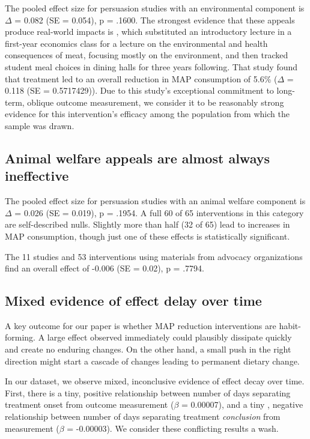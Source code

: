 \documentclass[sn-nature,referee,pdflatex]{sn-jnl}
\begin{document}
The pooled effect size for persuasion studies with an environmental
component is \(\Delta\) = 0.082 (SE = 0.054), p = .1600. The strongest
evidence that these appeals produce real-world impacts is
\citep{jalil2023}, which substituted an introductory lecture in a
first-year economics class for a lecture on the environmental and health
consequences of meat, focusing mostly on the environment, and then
tracked student meal choices in dining halls for three years following.
That study found that treatment led to an overall reduction in MAP
consumption of 5.6\% (\(\Delta\) = 0.118 (SE = 0.5717429)). Due to this
study's exceptional commitment to long-term, oblique outcome
measurement, we consider it to be reasonably strong evidence for this
intervention's efficacy among the population from which the sample was
drawn.

\subsection{Animal welfare appeals are almost always
ineffective}\label{sec2.9}

The pooled effect size for persuasion studies with an animal welfare
component is \(\Delta\) = 0.026 (SE = 0.019), p = .1954. A full 60 of 65
interventions in this category are self-described nulls. Slightly more
than half (32 of 65) lead to increases in MAP consumption, though just
one of these effects is statistically significant.

The 11 studies and 53 interventions using materials from advocacy
organizations find an overall effect of -0.006 (SE = 0.02), p = .7794.

\subsection{Mixed evidence of effect delay over time}\label{sec2.10}

A key outcome for our paper is whether MAP reduction interventions are
habit-forming. A large effect observed immediately \citep{hansen2019}
could plausibly dissipate quickly and create no enduring changes. On the
other hand, a small push in the right direction might start a cascade of
changes leading to permanent dietary change.

In our dataset, we observe mixed, inconclusive evidence of effect decay
over time. First, there is a tiny, positive relationship between number
of days separating treatment onset from outcome measurement (\(\beta\) =
0.00007), and a tiny , negative relationship between number of days
separating treatment \emph{conclusion} from measurement (\(\beta\) =
-0.00003). We consider these conflicting results a wash.
\end{document}
